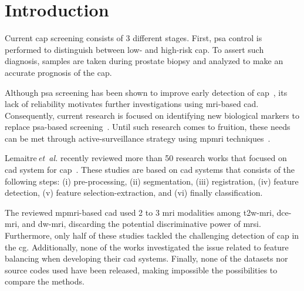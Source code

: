\section{Introduction}
Current \ac{cap} screening consists of 3 different stages.
First, \ac{psa} control is performed to distinguish between low- and
high-risk \ac{cap}.
To assert such diagnosis, samples are taken during prostate biopsy and
analyzed to make an accurate prognosis of the \ac{cap}.

Although \ac{psa} screening has been shown to improve early detection
of \ac{cap}~\cite{Chou2011}, its lack of reliability motivates further
investigations using \ac{mri}-based \ac{cad}.
Consequently, current research is focused on identifying new
biological markers to replace \ac{psa}-based
screening~\cite{Brenner2013}.
Until such research comes to fruition, these needs can be met through
active-surveillance strategy using \ac{mpmri}
techniques~\cite{Moore2013}.

Lemaitre\,\emph{et~al.} recently reviewed
more than 50 research works that focused on \ac{cad} system for
\ac{cap}~\cite{Lemaitre2015}.
These studies are based on \ac{cad} systems that consists of the
following steps:
(i) pre-processing,
(ii) segmentation,
(iii) registration,
(iv) feature detection,
(v) feature selection-extraction, and
(vi) finally classification.

The reviewed \ac{mpmri}-based \ac{cad} used 2 to 3
\ac{mri} modalities among \ac{t2w}-\ac{mri}, \ac{dce}-\ac{mri}, and
\ac{dw}-\ac{mri}, discarding the potential discriminative power of
\ac{mrsi}.
Furthermore, only half of these studies tackled the challenging
detection of \ac{cap} in the \ac{cg}.
Additionally, none of the works investigated the issue related to
feature balancing when developing their \ac{cad} systems.
Finally, none of the datasets nor source codes used have been
released, making impossible the possibilities to compare the methods.


